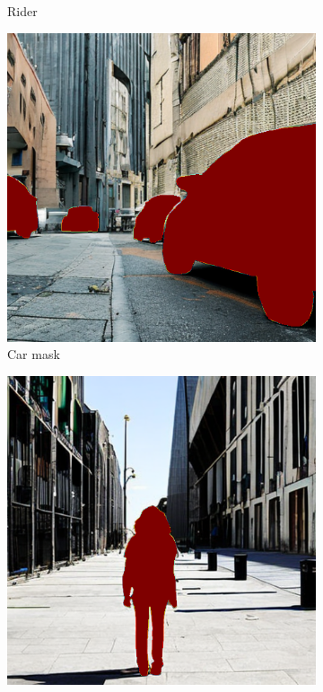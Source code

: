 \begin{figure}
\begin{subfigure}{0.24\columnwidth}
   \caption{Rider}
   \label{subfig:dataset-example-rider}
  \end{subfigure}
  \par\bigskip
  \begin{subfigure}{0.24\columnwidth}
   \includegraphics[width=\columnwidth]{img/4-experiments/example_mask_car.png}
   \caption{Car mask}
   \label{subfig:dataset-example-car-mask}
  \end{subfigure}
  \begin{subfigure}{0.24\columnwidth}
   \includegraphics[width=\columnwidth]{img/4-experiments/example_mask_person.png}

\end{subfigure}
\end{figure}
